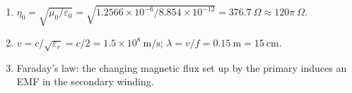 \begin{enumerate}[leftmargin=1.6em,itemsep=2pt]
\item $\eta_0 = \sqrt{\mu_0/\varepsilon_0} = \sqrt{1.2566\times10^{-6}/8.854\times10^{-12}} = 376.7\ \Omega \approx 120\pi\ \Omega$.
\item $v = c/\sqrt{\varepsilon_r} = c/2 = 1.5\times10^{8}\ \mathrm{m/s}$; $\lambda = v/f = 0.15\ \mathrm{m} = 15\ \mathrm{cm}$.
\item Faraday's law: the changing magnetic flux set up by the primary induces an EMF in the secondary winding.
\end{enumerate}
